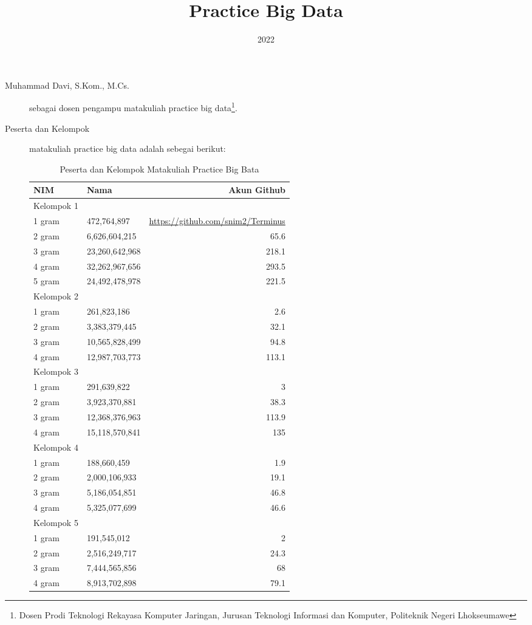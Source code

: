 \documentclass[a4paper]{tufte-handout}
\title{Practice Big Data}
\date{2022}
\begin{document}
\maketitle


\begin{projects}
	\begin{description}
		\item [Muhammad Davi, S.Kom., M.Cs.] sebagai dosen pengampu matakuliah practice big data\footnote{Dosen Prodi Teknologi Rekayasa Komputer Jaringan, Jurusan Teknologi Informasi dan Komputer, Politeknik Negeri Lhokseumawe}.
		\item [Peserta dan Kelompok] matakuliah practice big data adalah sebegai berikut:

\begin{table}[!ht]
\caption{Peserta dan Kelompok Matakuliah Practice Big Bata}
\label{tab:peserta}
\centering
\begin{tabular}{llr} 
\toprule
NIM 	&	Nama &	Akun Github\\
\midrule
Kelompok 1\\
\midrule
1 gram &	472,764,897 &	\url{https://github.com/snim2/Terminus} \\
2 gram &	6,626,604,215 &	65.6\\
3 gram &	23,260,642,968 &	218.1\\
4 gram &	32,262,967,656 &	293.5\\
5 gram &	24,492,478,978 &	221.5\\
\midrule
Kelompok 2\\
\midrule
1 gram &	261,823,186 &	2.6\\
2 gram &	3,383,379,445 &	32.1\\
3 gram &	10,565,828,499 &	94.8\\
4 gram &	12,987,703,773 &	113.1\\
\midrule
Kelompok 3\\
\midrule
1 gram &	291,639,822 &	3\\
2 gram &	3,923,370,881 &	38.3\\
3 gram &	12,368,376,963 &	113.9\\
4 gram &	15,118,570,841 &	135\\
\midrule
Kelompok 4\\
\midrule
1 gram &	188,660,459 &	1.9\\
2 gram &	2,000,106,933 &	19.1\\
3 gram &	5,186,054,851 &	46.8\\
4 gram &	5,325,077,699 &	46.6\\
\midrule
Kelompok 5\\
\midrule
1 gram	&	191,545,012	&	2\\
2 gram	&	2,516,249,717	&	24.3\\
3 gram	&	7,444,565,856	&	68\\
4 gram	&	8,913,702,898	&	79.1\\
\midrule
\end{tabular}
\end{table}
	\end{description}
\end{projects}
\end{document}
